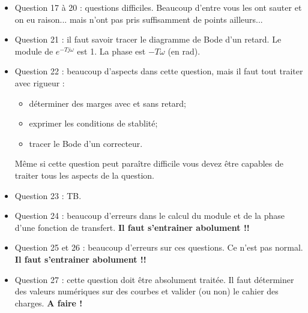 \documentclass[10pt,fleqn]{article} %
\begin{document}
\begin{itemize}
\item Question 17 à 20 : questions difficiles. Beaucoup d'entre vous les ont sauter et on eu raison... mais n'ont pas pris suffisamment de points ailleurs...
\item Question 21 : il faut savoir tracer le diagramme de Bode d'un retard. Le module de $e^{-Tj\omega}$ est 1. La phase est $-T\omega$ (en rad).
\item Question 22 : beaucoup d'aspects dans cette question, mais il faut tout traiter avec rigueur : 
\begin{itemize}
\item déterminer des marges avec et sans retard;
\item exprimer les conditions de stablité;
\item tracer le Bode d'un correcteur.
\end{itemize}
Même si cette question peut paraître difficile vous devez être capables de traiter tous les aspects de la question.
\item Question 23 : TB.
\item Question 24 : beaucoup d'erreurs dans le calcul du module et de la phase d'une fonction de transfert. \textbf{Il faut s'entrainer abolument !!}
\item Question 25 et 26 : beaucoup d'erreurs sur ces questions. Ce n'est pas normal. \textbf{Il faut s'entrainer abolument !!}
\item Question 27 : cette question doit être absolument traitée. Il faut déterminer des valeurs numériques sur des courbes et valider (ou non) le cahier des charges. \textbf{A faire !}
\end{itemize}






%
\end{document}
